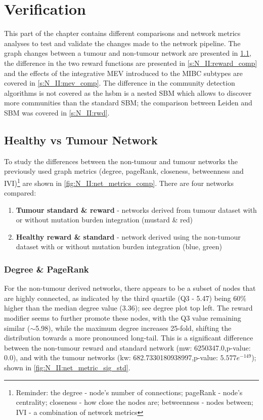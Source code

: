 \section{Verification} \label{s:N_II:validation}


This part of the chapter contains different comparisons and network metrics analyses to test and validate the changes made to the network pipeline. The graph changes between a tumour and non-tumour network are presented in \cref{s:N_II:net_comp}, the difference in the two reward functions are presented in \cref{s:N_II:reward_comp} and the effects of the integrative MEV introduced to the MIBC subtypes are covered in \cref{s:N_II:mev_comp}. The difference in the community detection algorithms is not covered as the \acrlong{hsbm} is a nested SBM which allows to discover more communities than the standard SBM; the comparison between Leiden and SBM was covered in \cref{s:N_II:rwd}.


\subsection{Healthy vs Tumour Network} \label{s:N_II:net_comp}

To study the differences between the non-tumour and tumour networks the previously used graph metrics (degree, pageRank, closeness, betweenness and IVI)\footnote{Reminder: the degree - node's number of connections; pageRank - node's centrality;  closeness - how close the nodes are; betweenness - nodes between; IVI - a combination of network metrics} are shown in \cref{fig:N_II:net_metrics_comp}. There are four networks compared:
\begin{enumerate}
    \item \textbf{Tumour standard \& reward} - networks derived from tumour dataset with or without mutation burden integration (mustard \& red)
    \item \textbf{Healthy reward \& standard} - network derived using the non-tumour dataset with or without mutation burden integration (blue, green)
\end{enumerate}


\subsubsection*{Degree \& PageRank}

For the non-tumour derived networks, there appears to be a subset of nodes that are highly connected, as indicated by the third quartile (Q3 - 5.47) being 60\% higher than the median degree value (3.36); see degree plot top left. The reward modifier seems to further promote these nodes, with the Q3 value remaining similar ($\sim$5.98), while the maximum degree increases 25-fold, shifting the distribution towards a more pronounced long-tail. This is a significant difference between the non-tumour reward and standard network (\acrshort{mw}: 6250347.0,p-value: 0.0), and with the tumour networks (\acrshort{kw}: 682.7330180938997,p-value: $5.577e^{-149}$); shown in \cref{fig:N_II:net_metric_sig_std}.

